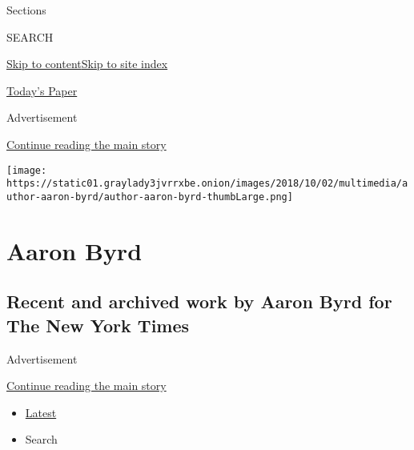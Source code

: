 Sections

SEARCH

\protect\hyperlink{site-content}{Skip to
content}\protect\hyperlink{site-index}{Skip to site index}

\href{https://myaccount.nytimes3xbfgragh.onion/auth/login?response_type=cookie\&client_id=vi}{}

\href{https://www.nytimes3xbfgragh.onion/section/todayspaper}{Today's
Paper}

Advertisement

\protect\hyperlink{after-top}{Continue reading the main story}

\texttt{[image: https://static01.graylady3jvrrxbe.onion/images/2018/10/02/multimedia/author-aaron-byrd/author-aaron-byrd-thumbLarge.png]}

\hypertarget{aaron-byrd}{%
\section{Aaron Byrd}\label{aaron-byrd}}

\hypertarget{recent-and-archived-work-by-aaron-byrd-for-the-new-york-times}{%
\subsection{Recent and archived work by Aaron Byrd for The New York
Times}\label{recent-and-archived-work-by-aaron-byrd-for-the-new-york-times}}

Advertisement

\protect\hyperlink{after-mid1}{Continue reading the main story}

\begin{itemize}
\tightlist
\item
  \protect\hyperlink{stream-panel}{Latest}
\item
  Search
\end{itemize}

